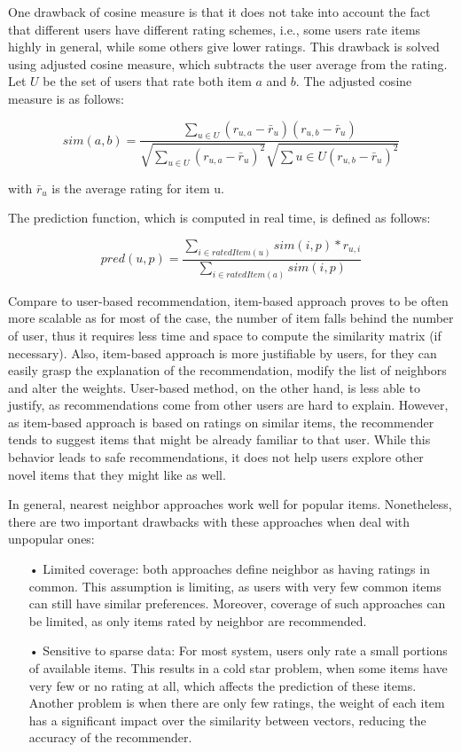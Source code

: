 One drawback of cosine measure is that it does not take into account the fact that different users have different rating schemes, i.e., some users rate items highly in general, while some others give lower ratings. This drawback is solved using adjusted cosine measure, which subtracts the user average from the rating. Let \( U\) be the set of users that rate both item \(a\) and \(b\). The adjusted cosine measure is as follows:

\begin{displaymath}
sim(a,b) = \frac{\sum_{u \in U}(r_{u,a} - \bar{r}_u)(r_{u,b} - \bar{r}_u)}{\sqrt{\sum_{u \in U}(r_{u,a} - \bar{r}_u)^2} \sqrt{\sum{u \in U}(r_{u,b} - \bar{r}_u)^2}}
\end{displaymath}

with \(\bar{r}_u \) is the average rating for item u.

The prediction function, which is computed in real time, is defined as follows:

\begin{displaymath}
pred(u,p) = \frac{\sum_{i \in ratedItem(u)}{sim(i,p) * r_{u,i}}}{\sum_{i \in ratedItem(a)}{sim(i,p)}}
\end{displaymath}

Compare to user-based recommendation, item-based approach proves to be often more scalable as for most of the case, the number of item falls behind the number of user, thus it requires less time and space to compute the similarity matrix (if necessary). Also, item-based approach is more justifiable by users, for they can easily grasp the explanation of the recommendation, modify the list of neighbors and alter the weights. User-based method, on the other hand, is less able to justify, as recommendations come from other users are hard to explain. However, as item-based approach is based on ratings on similar items, the recommender tends to suggest items that might be already familiar to that user. While this behavior leads to safe recommendations, it does not help users explore other novel items that they might like as well.

In general, nearest neighbor approaches work well for popular items. Nonetheless, there are two important drawbacks with these approaches when deal with unpopular ones:

\begin{itemize}
\item[•] Limited coverage: both approaches define neighbor as having ratings in common. This assumption is limiting, as users with very few common items can still have similar preferences. Moreover, coverage of such approaches can be limited, as only items rated by neighbor are recommended.

\item[•] Sensitive to sparse data: For most system, users only rate a small portions of available items. This results in a cold star problem, when some items have very few or no rating at all, which affects the prediction of these items. Another problem is when there are only few ratings, the weight of each item has a significant impact over the similarity between vectors, reducing the accuracy of the recommender. 
\end{itemize}

